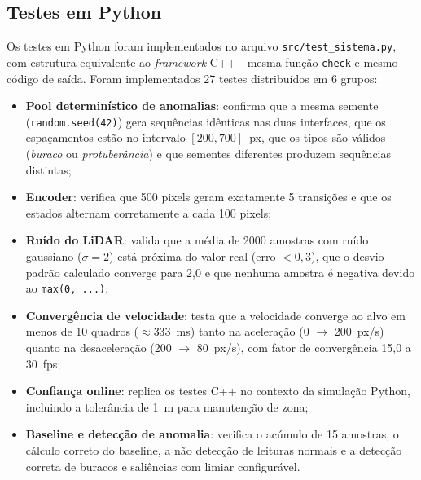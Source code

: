 \documentclass[12pt]{article}
\begin{document}
\subsection{Testes em Python}

Os testes em Python foram implementados no arquivo \texttt{src/test\_sistema.py}, com estrutura equivalente ao \textit{framework} C++ - mesma função \texttt{check} e mesmo código de saída. Foram implementados 27 testes distribuídos em 6 grupos:

\begin{sloppypar}
\begin{itemize}
    \item \textbf{Pool determinístico de anomalias}: confirma que a mesma semente (\texttt{random.seed(42)}) gera sequências idênticas nas duas interfaces, que os espaçamentos estão no intervalo $[200, 700]$~px, que os tipos são válidos (\textit{buraco} ou \textit{protuberância}) e que sementes diferentes produzem sequências distintas;

    \item \textbf{Encoder}: verifica que 500 pixels geram exatamente 5 transições e que os estados alternam corretamente a cada 100 pixels;

    \item \textbf{Ruído do LiDAR}: valida que a média de 2000 amostras com ruído gaussiano ($\sigma = 2$) está próxima do valor real (erro $< 0{,}3$), que o desvio padrão calculado converge para 2,0 e que nenhuma amostra é negativa devido ao \mbox{\texttt{max(0, ...)}};

    \item \textbf{Convergência de velocidade}: testa que a velocidade converge ao alvo em menos de 10 quadros ($\approx 333$~ms) tanto na aceleração (0 $\rightarrow$ 200~px/s) quanto na desaceleração (200 $\rightarrow$ 80~px/s), com fator de convergência 15,0 a 30~fps;

    \item \textbf{Confiança online}: replica os testes C++ no contexto da simulação Python, incluindo a tolerância de 1~m para manutenção de zona;

    \item \textbf{Baseline e detecção de anomalia}: verifica o acúmulo de 15 amostras, o cálculo correto do baseline, a não detecção de leituras normais e a detecção correta de buracos e saliências com limiar configurável.
\end{itemize}
\end{sloppypar}
\end{document}
